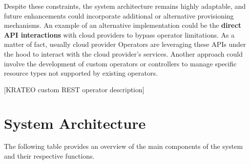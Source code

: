 Despite these constraints, the system architecture remains highly adaptable, and future enhancements could incorporate additional or alternative provisioning mechanisms. 
An example of an alternative implementation could be the \textbf{direct API interactions} with cloud providers to bypass operator limitations. As a matter of fact, usually cloud provider Operators are leveraging these APIs under the hood to interact with the cloud provider’s services.
Another approach could involve the development of custom operators or controllers to manage specific resource types not supported by existing operators. 

[KRATEO custom REST operator description]

\section{System Architecture}
\label{sec:system_architecture}

The following table provides an overview of the main components of the system and their respective functions.

